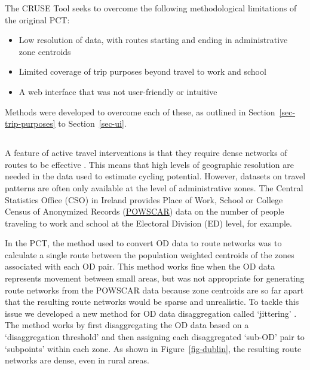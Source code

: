 \documentclass[
  super,
  preprint,
  3p]{elsarticle}
\providecommand{\tightlist}{%
  \setlength{\itemsep}{0pt}\setlength{\parskip}{0pt}}\usepackage{longtable,booktabs,array}
\providecommand{\DIFadd}[1]{{\protect\color{blue}\uwave{#1}}} %
\providecommand{\DIFaddbegin}{} %
\providecommand{\DIFaddend}{} %
\providecommand{\DIFdelbegin}{} %
\providecommand{\DIFdelend}{} %
\newcommand{\DIFscaledelfig}{0.5}
\newlength{\DIFdelgraphicswidth} %
\newlength{\DIFdelgraphicsheight} %
\newcommand{\DIFaddincludegraphics}[2][]{{\color{blue}\fbox{\DIFOincludegraphics[#1]{#2}}}} %
\newcommand{\DIFdelincludegraphics}[2][]{%
\sbox{\DIFdelgraphicsbox}{\DIFOincludegraphics[#1]{#2}}%
\settoboxwidth{\DIFdelgraphicswidth}{\DIFdelgraphicsbox} %
\settoboxtotalheight{\DIFdelgraphicsheight}{\DIFdelgraphicsbox} %
\scalebox{\DIFscaledelfig}{%
\parbox[b]{\DIFdelgraphicswidth}{\usebox{\DIFdelgraphicsbox}\\[-\baselineskip] \rule{\DIFdelgraphicswidth}{0em}}\llap{\resizebox{\DIFdelgraphicswidth}{\DIFdelgraphicsheight}{%
\setlength{\unitlength}{\DIFdelgraphicswidth}%
\begin{picture}(1,1)%
\thicklines\linethickness{2pt} %
{\color[rgb]{1,0,0}\put(0,0){\framebox(1,1){}}}%
{\color[rgb]{1,0,0}\put(0,0){\line( 1,1){1}}}%
{\color[rgb]{1,0,0}\put(0,1){\line(1,-1){1}}}%
\end{picture}%
}\hspace*{3pt}}} %
} %
\DeclareRobustCommand{\DIFaddbegin}{\DIFOaddbegin \let\includegraphics\DIFaddincludegraphics} %
\DeclareRobustCommand{\DIFaddend}{\DIFOaddend \let\includegraphics\DIFOincludegraphics} %
\DeclareRobustCommand{\DIFdelbegin}{\DIFOdelbegin \let\includegraphics\DIFdelincludegraphics} %
\DeclareRobustCommand{\DIFdelend}{\DIFOaddend \let\includegraphics\DIFOincludegraphics} %
\begin{document}
The CRUSE Tool seeks to overcome the following methodological
limitations of the original PCT:

\begin{itemize}
\tightlist
\item
  Low resolution of data, with routes starting and ending in
  administrative zone centroids
\item
  Limited coverage of trip purposes beyond travel to work and school
\item
  A web interface that was not user-friendly or intuitive
\end{itemize}

Methods were developed to overcome each of these, as outlined in
Section~\ref{sec-trip-purposes} to Section~\ref{sec-ui}.

\DIFdelbegin %
\DIFdelend \DIFaddbegin \subsection{\DIFadd{Disaggregation of origin-destination
data}}\label{sec-disaggregation}
\DIFaddend 

A feature of active travel interventions is that they require dense
networks of routes to be effective \citep{parkin2018}. This means that
high levels of geographic resolution are needed in the data used to
estimate cycling potential. However, datasets on travel patterns are
often only available at the level of administrative zones. The Central
Statistics Office (CSO) in Ireland provides Place of Work, School or
College Census of Anonymized Records
(\href{https://www.cso.ie/en/census/census2016reports/powscar/}{POWSCAR})
data on the number of people traveling to work and school at the
Electoral Division (ED) level, for example.

In the PCT, the method used to convert OD data to route networks was to
calculate a single route between the population weighted centroids of
the zones associated with each OD pair. This method works fine when the
OD data represents movement between small areas, but was not appropriate
for generating route networks from the POWSCAR data because zone
centroids are so far apart that the resulting route networks would be
sparse and unrealistic. To tackle this issue we developed a new method
for OD data disaggregation called `jittering' \citep{lovelace2022}. The
method works by first disaggregating the OD data based on a
`disaggregation threshold' and then assigning each disaggregated
`sub-OD' pair to `subpoints' within each zone. As shown in
Figure~\ref{fig-dublin}, the resulting route networks are dense, even in
rural areas.
\end{document}
